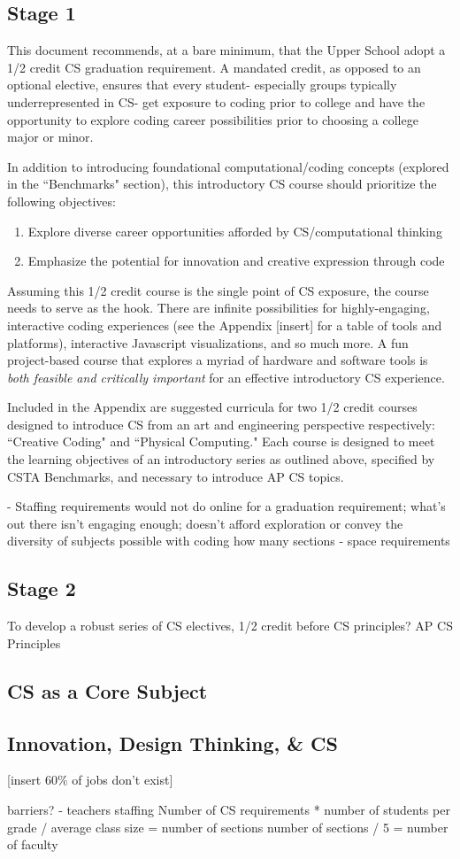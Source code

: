 \subsection{Stage 1}
This document recommends, at a bare minimum, that the Upper School adopt a 1/2 credit CS graduation requirement. A mandated credit, as opposed to an optional elective, ensures that every student- especially groups typically underrepresented in CS- get exposure to coding prior to college and have the opportunity to explore coding career possibilities prior to choosing a college major or minor. \par
In addition to introducing foundational computational/coding concepts (explored in the ``Benchmarks" section), this introductory CS course should prioritize the following objectives: \par 
\begin{enumerate}
	\item Explore diverse career opportunities afforded by CS/computational thinking
	\item Emphasize the potential for innovation and creative expression through code
\end{enumerate} \par
Assuming this 1/2 credit course is the single point of CS exposure, the course needs to serve as the hook. There are infinite possibilities for highly-engaging, interactive coding experiences (see the Appendix [insert] for a table of tools and platforms), interactive Javascript visualizations, and so much more. A fun project-based course that explores a myriad of hardware and software tools is \textit{both feasible and critically important} for an effective introductory CS experience. \par
Included in the Appendix are suggested curricula for two 1/2 credit courses designed to introduce CS from an art and engineering perspective respectively: ``Creative Coding" and ``Physical Computing." Each course is designed to meet the learning objectives of an introductory series as outlined above, specified by CSTA Benchmarks, and necessary to introduce AP CS topics. \par
[what other courses are we referencing insert] \par
- Staffing requirements
would not do online for a graduation requirement; what's out there isn't engaging enough; doesn't afford exploration or convey the diversity of subjects possible with coding
how many sections 
- space requirements
\subsection{Stage 2}
To develop a robust series of CS electives, 
1/2 credit before CS principles? 
AP CS Principles

\subsection{CS as a Core Subject}
\subsection{Innovation, Design Thinking, \& CS}
[insert 60\% of jobs don't exist]

barriers?
- teachers
staffing
Number of CS requirements * number of students per grade / average class size = number of sections
number of sections / 5 = number of faculty
